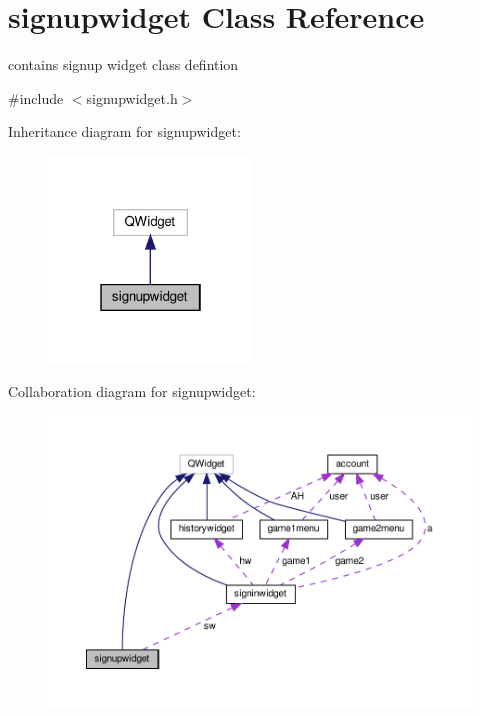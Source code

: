 \hypertarget{classsignupwidget}{}\section{signupwidget Class Reference}
\label{classsignupwidget}


contains signup widget class defintion  




{\ttfamily \#include $<$signupwidget.\+h$>$}



Inheritance diagram for signupwidget\+:\nopagebreak
\begin{figure}[H]
\begin{center}
\leavevmode
\includegraphics[width=154pt]{classsignupwidget__inherit__graph}
\end{center}
\end{figure}


Collaboration diagram for signupwidget\+:\nopagebreak
\begin{figure}[H]
\begin{center}
\leavevmode
\includegraphics[width=350pt]{classsignupwidget__coll__graph}
\end{center}
\end{figure}
